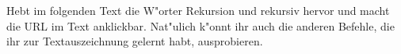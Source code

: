 Hebt im folgenden Text die W"orter \glqq{}Rekursion\grqq{} und \glqq{}rekursiv\grqq{} hervor und macht die URL im Text anklickbar. Nat"ulich k"onnt ihr auch die anderen Befehle, die ihr zur Textauszeichnung gelernt habt, ausprobieren. 


